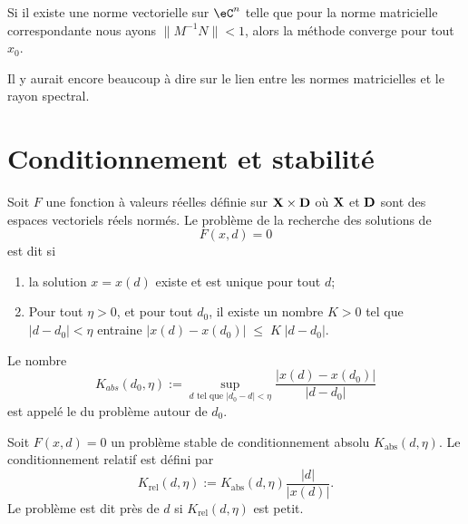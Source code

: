 \begin{theorem}
    Si il existe une norme vectorielle sur \( \eC^n\) telle que pour la norme matricielle correspondante nous ayons \( \| M^{-1}N \|<1\), alors la méthode converge pour tout \( x_0\).
\end{theorem}

Il y aurait encore beaucoup à dire sur le lien entre les normes matricielles et le rayon spectral.

\section{Conditionnement et stabilité}

\begin{definition}
	Soit $F$ une fonction à valeurs réelles définie sur ${\bf X}\times{\bf D}$ o\`u ${\bf X}$ et ${\bf D}$ sont des espaces vectoriels réels normés. Le problème de la recherche des solutions de 
	\begin{equation}
		F(x,d)=0
	\end{equation}
	est dit  si 
	\begin{enumerate}
		\item 
			la solution $x=x(d)$ existe et est unique pour tout $d$;
		\item \label{ItemProbStableB}
			Pour tout $\eta>0$, et pour tout $d_0$, il existe un nombre $K>0$ tel que $|d-d_0|<\eta$ entraine $|x(d)-x(d_0)|\;\leq\;K\;|d-d_0|$.
	\end{enumerate}
\end{definition}
Le nombre 
\begin{equation}		\label{EqDefAABSOLU}
	K_{abs}(d_0,\eta):=\sup_{d\text{ tel que $|d_0-d|<\eta$}}\frac{|x(d)-x(d_0)|}{|d-d_0|}
\end{equation}
est appelé le  du problème autour de $d_0$.

\begin{definition}	
	Soit $F(x,d)=0$ un problème stable de conditionnement absolu $K_{\text{abs}}(d,\eta)$.  Le conditionnement relatif est défini par
	\begin{equation}
		K_{\text{rel}}(d,\eta):=K_{\text{abs}}(d,\eta)\frac{|d|}{|x(d)|}.
	\end{equation}
	Le problème est dit  près de $d$ si $K_{\text{rel}}(d,\eta)$ est petit.
\end{definition}

